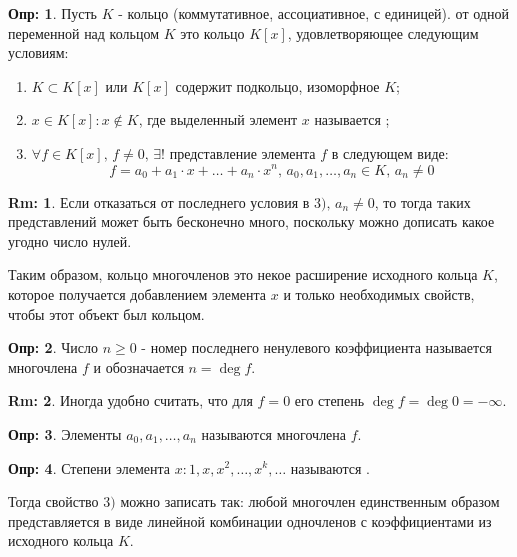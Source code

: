 \documentclass[12pt]{article}
\theoremstyle{definition}
\newtheorem{defn}{Опр:}
\newtheorem{rem}{Rm:}
\begin{document}
\begin{defn}
	Пусть $K$ - кольцо (коммутативное, ассоциативное, с единицей).  от одной переменной над кольцом $K$ это кольцо $K[x]$, удовлетворяющее следующим условиям:
	\begin{enumerate}[label=\arabic*)]
		\item $K \subset K[x]$ или $K[x]$ содержит подкольцо, изоморфное $K$;
		\item $x \in K[x] \colon x \not\in K$, где выделенный элемент $x$ называется ;
		\item $\forall f \in K[x], \, f \neq 0, \, \exists!$ представление элемента $f$ в следующем виде:
		$$
			f = a_0 + a_1{\cdot}x + \dotsc + a_n{\cdot}x^n, \, a_0, a_1,\dotsc, a_n \in K,\, a_n \neq 0
		$$
	\end{enumerate}
\end{defn}
\begin{rem}
	Если отказаться от последнего условия в $3), \, a_n \neq 0$, то тогда таких представлений может быть бесконечно много, поскольку можно дописать какое угодно число нулей. 
\end{rem}
Таким образом, кольцо многочленов это некое расширение исходного кольца $K$, которое получается добавлением элемента $x$ и только необходимых свойств, чтобы этот объект был кольцом.
\begin{defn}
	Число $n \geq 0$ - номер последнего ненулевого коэффициента называется  многочлена $f$ и обозначается $n = \deg{f}$.
\end{defn}
\begin{rem}
	Иногда удобно считать, что для $f = 0$ его степень $\deg{f} = \deg{0} = -\infty$.
\end{rem}
\begin{defn}
	Элементы $a_0,a_1,\dotsc, a_n$ называются  многочлена $f$.
\end{defn}
\begin{defn}
	Степени элемента $x \colon 1,x, x^2, \dotsc, x^k, \dotsc$ называются .
\end{defn}
Тогда свойство $3)$ можно записать так: любой многочлен единственным образом представляется в виде линейной комбинации одночленов с коэффициентами из исходного кольца $K$.
\end{document}
